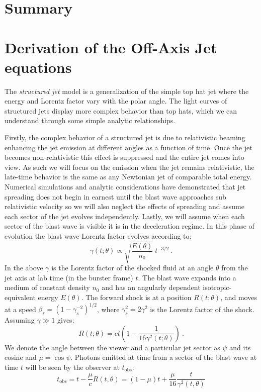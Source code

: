 \documentclass[twocolumn]{aastex62}
\newcommand{\tobs}{\ensuremath{t_{\mathrm{obs}}}}
\begin{document}
\section{Summary}




\newpage


\appendix
\section{Derivation of the Off-Axis Jet equations}\label{sec:derive1}

  The \emph{structured jet} model is a generalization of the simple top hat jet where the energy and Lorentz factor vary with the polar angle.  The light curves of structured jets display more complex behavior than top hats, which we can understand through some simple analytic relationships.
  
  Firstly, the complex behavior of a structured jet is due to relativistic beaming enhancing the jet emission at different angles as a function of time.  Once the jet becomes non-relativistic this effect is suppressed and the entire jet comes into view.  As such we will focus on the emission when the jet remains relativistic, the late-time behavior is the same as any Newtonian jet of comparable total energy.  Numerical simulations and analytic considerations have demonstrated that jet spreading does not begin in earnest until the blast wave approaches sub relativistic velocity so we will also neglect the effects of spreading and assume each sector of the jet evolves independently.  Lastly, we will assume when each sector of the blast wave is visible it is in the deceleration regime.  In this phase of evolution the blast wave Lorentz factor evolves according to:
  \begin{equation}
	\gamma(t; \theta) \propto \sqrt{\frac{E(\theta)}{n_0}}\ t^{-3/2}\ . \label{eq:lorentzEvolution}
\end{equation}
  In the above $\gamma$ is the Lorentz factor of the shocked fluid at an angle $\theta$ from the jet axis at lab time (in the burster frame) $t$.  The blast wave expands into a medium of constant density $n_0$ and has an angularly dependent isotropic-equivalent energy $E(\theta)$.  The forward shock is at a position $R(t; \theta)$, and moves at a speed $\beta_s = (1-\gamma_s^{-2})^{1/2}$, where $\gamma_s^2 = 2 \gamma^2$ is the Lorentz factor of the shock.  Assuming $\gamma \gg 1$ gives:
\begin{equation}
	R(t; \theta) = ct\left(1-\frac{1}{16 \gamma^2(t; \theta)}\right)\ .
\end{equation}
We denote the angle between the viewer and a particular jet sector as $\psi$ and its cosine and $\mu = \cos \psi$.  Photons emitted at time from a sector of the blast wave at time $t$ will be seen by the observer at $\tobs$:
\begin{equation}
	\tobs = t - \frac{\mu}{c} R(t,\theta) = (1-\mu)t + \frac{\mu}{16}\frac{t}{ \gamma^2(t,\theta)} \label{eq:tobs}
\end{equation}
\end{document}
